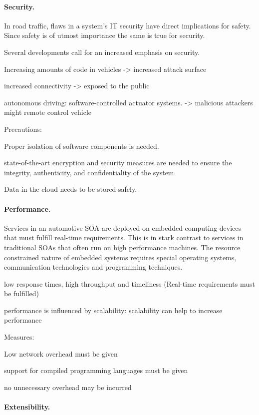 \paragraph{Security.}
In road traffic, flaws in a system's IT security have direct implications for safety. Since safety is of utmost importance the same is true for security. 

Several developments call for an increased emphasis on security.

Increasing amounts of code in vehicles -> increased attack surface

increased connectivity -> exposed to the public 

autonomous driving: software-controlled actuator systems. -> malicious attackers might remote control vehicle


Precautions:

Proper isolation of software components is needed.

state-of-the-art encryption and security measures are needed to ensure the integrity, authenticity, and confidentiality of the system.

Data in the cloud needs to be stored safely.


\paragraph{Performance.}
Services in an automotive SOA are deployed on embedded computing devices that must fulfill real-time requirements. This is in stark contrast to services in traditional SOAs that often run on high performance machines. The resource constrained nature of embedded systems requires special operating systems, communication technologies and programming techniques.

low response times, high throughput and timeliness (Real-time requirements must be fulfilled)

performance is influenced by scalability: scalability can help to increase performance

Measures:

Low network overhead must be given

support for compiled programming languages must be given

no unnecessary overhead may be incurred


\paragraph{Extensibility.} 


